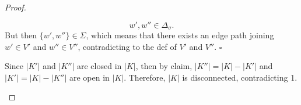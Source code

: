 \begin{proof}
\begin{itemize}
\begin{itemize}
            $$w' , w'' \in \Delta_\sigma.$$
            But then $\{ w',w''\} \in \Sigma$, which means that there exists an edge path joining $w' \in V'$ and $w'' \in V''$, contradicting to the def of $V'$ and $V''$. $\square$
        \end{itemize}
        Since $|K'|$ and $|K''|$ are closed in $|K|$, then by claim, $|K''| = |K| - |K'|$ and $|K'| = |K| - |K''|$ are open in $|K|$. Therefore, $|K|$ is disconnected, contradicting 1.
    \end{itemize}
\end{proof}
